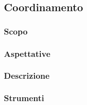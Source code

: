 \subsection{Coordinamento}

\subsubsection{Scopo}

\subsubsection{Aspettative}

\subsubsection{Descrizione}





\subsubsection{Strumenti}